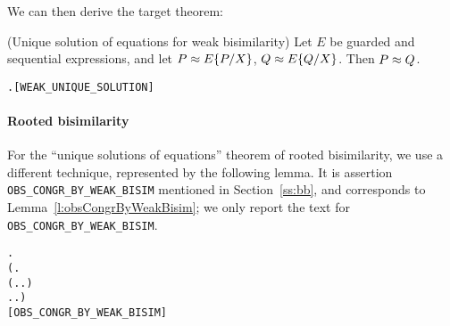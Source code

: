 We can then derive the target theorem:
\begin{theorem}{(Unique solution of equations for weak bisimilarity)}
Let $E$ be guarded and sequential expressions, and let $P \approx
E\{P/X\}$,
$Q \approx E\{Q/X\}$. Then $P \approx Q$.
\begin{alltt}
\HOLTokenTurnstile{}   \HOLSymConst{\HOLTokenConj{}}   \HOLSymConst{\HOLTokenImp{}} \HOLSymConst{\HOLTokenForall{}} .  \HOLSymConst{\HOLTokenWeakEQ}   \HOLSymConst{\HOLTokenConj{}}  \HOLSymConst{\HOLTokenWeakEQ}   \HOLSymConst{\HOLTokenImp{}}  \HOLSymConst{\HOLTokenWeakEQ} \hfill{[WEAK_UNIQUE_SOLUTION]}
\end{alltt}
\end{theorem}

\paragraph{Rooted bisimilarity}
For the ``unique solutions of
equations'' theorem of rooted bisimilarity, we use a different
technique, represented by the
following lemma.   It is   assertion 
 \texttt{OBS_CONGR_BY_WEAK_BISIM} mentioned in
 Section~\ref{ss:bb}, and corresponds to
 Lemma~\ref{l:obsCongrByWeakBisim}; we only report the text for  \texttt{OBS_CONGR_BY_WEAK_BISIM}.

\begin{lemma}
\begin{alltt}
\HOLTokenTurnstile{}   \HOLSymConst{\HOLTokenImp{}}
   \HOLSymConst{\HOLTokenForall{}} .
       (\HOLSymConst{\HOLTokenForall{}}.
            (\HOLSymConst{\HOLTokenForall{}}.  \HOLTokenTransBegin{}\HOLTokenTransEnd {} \HOLSymConst{\HOLTokenImp{}} \HOLSymConst{\HOLTokenExists{}}.  \HOLTokenWeakTransBegin{}\HOLTokenWeakTransEnd {} \HOLSymConst{\HOLTokenConj{}}   ) \HOLSymConst{\HOLTokenConj{}}
            \HOLSymConst{\HOLTokenForall{}}.  \HOLTokenTransBegin{}\HOLTokenTransEnd {} \HOLSymConst{\HOLTokenImp{}} \HOLSymConst{\HOLTokenExists{}}.  \HOLTokenWeakTransBegin{}\HOLTokenWeakTransEnd {} \HOLSymConst{\HOLTokenConj{}}   ) \HOLSymConst{\HOLTokenImp{}}
        \HOLSymConst{\HOLTokenObsCongr} \hfill{[OBS_CONGR_BY_WEAK_BISIM]}
\end{alltt}
\end{lemma}

